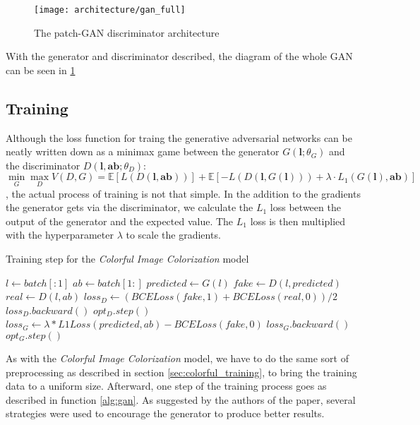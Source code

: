 \begin{figure}[!ht]
	\centering
	\texttt{[image: architecture/gan\_full]}
    \caption{The patch-GAN discriminator architecture}
	\label{fig:architecture_gan_full}
\end{figure}

With the generator and discriminator described, the diagram of the whole GAN can
be seen in \ref{fig:architecture_gan_full}


\subsection{Training}

Although the loss function for traing the generative adversarial networks can be neatly 
written down as a minimax game between the generator $G(\mathbf{l};\theta_G)$ and the 
discriminator $D(\mathbf{l, ab};\theta_D)$:
\begin{equation}
	\min_{G}\max_{D}V(D,G)=\mathbb{E}[L(D(\mathbf{l, ab}))] + \mathbb{E}[-L(D(\mathbf{l}, G(\mathbf{l}))) + \lambda \cdot \mathit{L_1}(G(\mathbf{l}), \mathbf{ab})]
\end{equation}
, the actual process of training is not that simple. In the addition to the gradients 
the generator gets via the discriminator, we calculate the $\mathit{L_1}$ loss between
the output of the generator and the expected value. The $\mathit{L_1}$ loss is then 
multiplied with the hyperparameter $\lambda$ to scale the gradients.

\begin{algorithm}[!ht]
	\caption{Training step for the \textit{Colorful Image Colorization} model}
	\label{alg:gan}
	\begin{algorithmic}		
			\State $l \leftarrow batch[:1]$	
			\State $ab \leftarrow batch[1:]$
			\State $predicted \leftarrow G(l)$
			\State $fake \leftarrow D(l, predicted)$
			\State $real \leftarrow D(l, ab)$
			\State $loss_D \leftarrow (BCELoss(fake, 1) + BCELoss(real, 0))/2$
			\State $loss_D.backward()$
			\State $opt_D.step()$
			\State $loss_G \leftarrow \lambda * L1Loss(predicted, ab) - BCELoss(fake, 0)$
			\State $loss_G.backward()$
			\State $opt_G.step()$
		\EndFunction
	\end{algorithmic}
\end{algorithm}

As with the \textit{Colorful Image Colorization} model, we have to do the same sort of 
preprocessing as described in section \ref{sec:colorful_training}, to bring the training
data to a uniform size. Afterward, one step of the training process goes as described in 
function \ref{alg:gan}. As suggested by the authors of the paper, several strategies 
were used to encourage the generator to produce better results.

